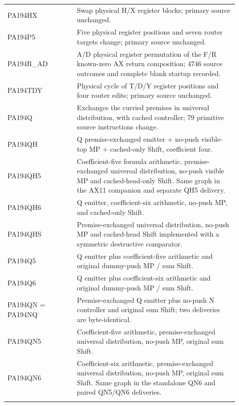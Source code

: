 \begin{longtable}{>{\raggedright\arraybackslash}p{0.28\linewidth}>{\raggedright\arraybackslash}p{0.65\linewidth}}
PA194HX & Swap physical H/\allowbreak{}X register blocks; primary source unchanged.\\\addlinespace[4pt]
PA194P5 & Five physical register positions and seven router targets change; primary source unchanged.\\\addlinespace[4pt]
PA194R\_AD & A/\allowbreak{}D physical register permutation of the F/\allowbreak{}R known-zero AX return composition; 4746 source outcomes and complete blank startup recorded.\\\addlinespace[4pt]
PA194TDY & Physical cycle of T/\allowbreak{}D/\allowbreak{}Y register positions and four router edits; primary source unchanged.\\\addlinespace[4pt]
PA194Q & Exchanges the curried premises in universal distribution, with cached controller; 79 primitive source instructions change.\\\addlinespace[4pt]
PA194QH & Q premise-exchanged emitter + no-push visible-top MP + cached-only Shift, coefficient four.\\\addlinespace[4pt]
PA194QH5 & Coefficient-five formula arithmetic, premise-exchanged universal distribution, no-push visible MP and cached-head-only Shift. Same graph in the AX11 companion and separate QH5 delivery.\\\addlinespace[4pt]
PA194QH6 & Q emitter, coefficient-six arithmetic, no-push MP, and cached-only Shift.\\\addlinespace[4pt]
PA194QHS & Premise-exchanged universal distribution, no-push MP and cached-head Shift implemented with a symmetric destructive comparator.\\\addlinespace[4pt]
PA194Q5 & Q emitter plus coefficient-five arithmetic and original dummy-push MP /\allowbreak{} sum Shift.\\\addlinespace[4pt]
PA194Q6 & Q emitter plus coefficient-six arithmetic and original dummy-push MP /\allowbreak{} sum Shift.\\\addlinespace[4pt]
PA194QN = PA194NQ & Premise-exchanged Q emitter plus no-push N controller and original sum Shift; two deliveries are byte-identical.\\\addlinespace[4pt]
PA194QN5 & Coefficient-five arithmetic, premise-exchanged universal distribution, no-push MP, original sum Shift.\\\addlinespace[4pt]
PA194QN6 & Coefficient-six arithmetic, premise-exchanged universal distribution, no-push MP, original sum Shift. Same graph in the standalone QN6 and paired QN5/\allowbreak{}QN6 deliveries.\\\addlinespace[4pt]

\end{longtable}

